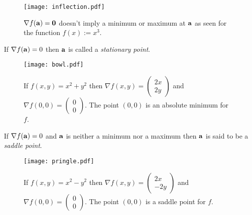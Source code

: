 \begin{figure}
    \begin{center}
        \texttt{[image: inflection.pdf]}
        \caption{\(\nabla f(\aa) =  \mathbf{0}\) doesn't imply a minimum or maximum at \(\aa\) as seen for the function \(f(x):=x^3\).}
    \end{center}
\end{figure}



\begin{definition}
    If \(\nabla f(\aa)=0\) then \(\aa\) is called a \emph{stationary point}.
\end{definition}


\begin{figure}
    \begin{center}
        \texttt{[image: bowl.pdf]}
        \caption{If \(f(x,y)=x^2+y^2\) then \(\nabla f(x,y) = \left(\begin{smallmatrix}
                2x\\2y
            \end{smallmatrix}\right)\) and \(\nabla f(0,0) =\left(\begin{smallmatrix}
                0\\0
            \end{smallmatrix}\right) \). The point \((0,0)\) is an absolute minimum for \(f\).}
    \end{center}
\end{figure}


\begin{definition}
    If \(\nabla f(\aa)=0\) and \(\aa\) is neither a minimum nor a maximum then \(\aa\) is said to be a \emph{saddle point}.
\end{definition}



\begin{figure}
    \begin{center}
        \texttt{[image: pringle.pdf]}
        \caption{If \(f(x,y)=x^2-y^2\) then \(\nabla f(x,y) = \left(\begin{smallmatrix}
                2x\\-2y
            \end{smallmatrix}\right)\) and \(\nabla f(0,0) =\left(\begin{smallmatrix}
                0\\0
            \end{smallmatrix}\right) \). The point \((0,0)\) is a saddle point for \(f\).}
    \end{center}
\end{figure}


